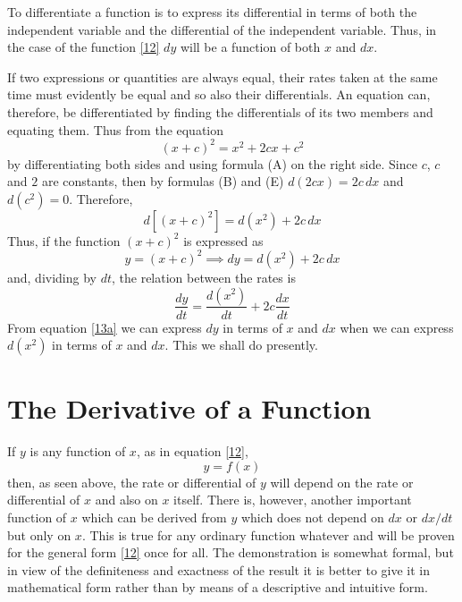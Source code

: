 To differentiate a function is to express its differential in terms of both the independent variable and the differential of the independent variable. Thus, in the case of the function \eqref{12} $dy$ will be a function of both $x$ and $dx$.

If two expressions or quantities are always equal, their rates taken at the same time must evidently be equal and so also their differentials. An equation can, therefore, be differentiated by finding the differentials of its two members and equating them. Thus from the equation
\[
(x + c)^2 = x^2 + 2cx + c^2
\]
by differentiating both sides and using formula (A) on the right side. Since $c$, $c$ and $2$ are constants, then by formulas (B) and (E) $d(2cx) = 2c\,dx$ and $d(c^2) = 0$. Therefore,
\[
d[(x+c)^2] = d(x^2) + 2c\,dx
\tag{13}
\label{13}
\]
Thus, if the function $(x+c)^2$ is expressed as
\[
y = (x+c)^2 \implies dy = d(x^2) + 2c\,dx
\tag{13a}
\label{13a}
\]
and, dividing by $dt$, the relation between the rates is
\[
\frac{dy}{dt} = \frac{d(x^2)}{dt} + 2c \frac{dx}{dt}
\tag{13b}
\label{13b}
\]
From equation \eqref{13a} we can express $dy$ in terms of $x$ and $dx$ when we can express $d(x^2)$ in terms of $x$ and $dx$. This we shall do presently.

\section{The Derivative of a Function}
If $y$ is any function of $x$, as in equation \eqref{12},
\[y = f(x) \tag{12} \label{12}\]
then, as seen above, the rate or differential of $y$ will depend on the rate or differential of $x$ and also on $x$ itself. There is, however, another important function of $x$ which can be derived from $y$ which does not depend on $dx$ or $dx/dt$ but only on $x$. This is true for any ordinary function whatever and will be proven for the general form \eqref{12} once for all. The demonstration is somewhat formal, but in view of the definiteness and exactness of the result it is better to give it in mathematical form rather than by means of a descriptive and intuitive form.

